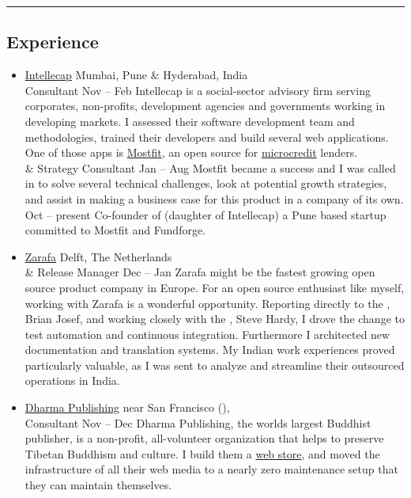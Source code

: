\documentclass[10pt,a4paper]{article}
\begin{document}
\hrule \vspace{-0.4em} \subsection*{Experience}

\begin{itemize} \parskip=0.1em

  \item  %
  \headerrow
    {\href{http://www.intellecap.com}{Intellecap}}
    {\sc Mumbai, Pune \& Hyderabad, India}
  \\
  \subheaderrow
    { Consultant}
    {Nov  -- Feb }
  Intellecap is a social-sector advisory firm serving corporates, non-profits, development agencies and governments working in developing markets. I assessed their software development team and methodologies, trained their developers and build several web applications. One of those apps is \href{http://www.mostfit.org}{Mostfit}, an open source  for \href{http://en.wikipedia.org/wiki/Microcredit}{microcredit} lenders.
  \\
  \subheaderrow
    { \& Strategy Consultant}
    {Jan  -- Aug }
  Mostfit became a success and I was called in to solve several technical challenges, look at potential growth strategies, and assist in making a business case for this product in a company of its own.
  \\
  \subheaderrow
    {}
    {Oct  -- present}
  Co-founder of  (daughter of Intellecap) a Pune based startup committed to Mostfit and Fundforge.

  \item  %
  \headerrow
    {\href{http://www.zarafa.com}{Zarafa}}
    {\sc Delft, The Netherlands}
  \\
  \subheaderrow
    { \& Release Manager}
    {Dec  -- Jan }
  Zarafa might be the fastest growing open source product company in Europe. For an open source enthusiast like myself, working with Zarafa is a wonderful opportunity. Reporting directly to the , Brian Josef, and working closely with the , Steve Hardy, I drove the change to test automation and continuous integration. Furthermore I architected new documentation and translation systems. My Indian work experiences proved particularly valuable, as I was sent to analyze and streamline their outsourced operations in India.

  \item  %
  \headerrow
    {\href{http://www.dharmapublishing.com}{Dharma Publishing}}
    {\sc near San Francisco (), }
  \\
  \subheaderrow
    { Consultant}
    {Nov  -- Dec }
  Dharma Publishing, the worlds largest Buddhist publisher, is a non-profit, all-volunteer organization that helps to preserve Tibetan Buddhism and culture. I build them a \href{http://www.dharmapublishing.com}{web store}, and moved the infrastructure of all their web media to a nearly zero maintenance setup that they can maintain themselves.


\end{itemize}
\end{document}

